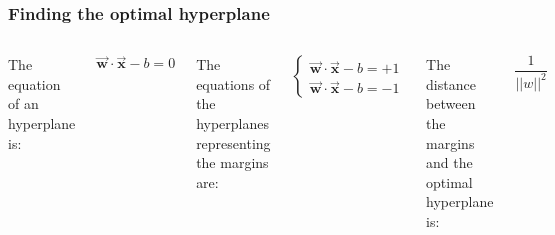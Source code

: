 \documentclass{beamer}
\begin{document}
\begin{frame}
  \frametitle{Finding the optimal hyperplane}
  \begin{columns}
      \parbox{\linewidth}{The equation of an hyperplane is:

      \begin{equation}
        \vec{\boldsymbol{w}} \cdot \vec{\boldsymbol{x}} - b = 0
      \end{equation}

      The equations of the hyperplanes representing the margins are:

      \begin{equation}
        \begin{cases}
          \vec{\boldsymbol{w}} \cdot \vec{\boldsymbol{x}} - b = +1\\
          \vec{\boldsymbol{w}} \cdot \vec{\boldsymbol{x}} - b = -1
        \end{cases}
      \end{equation}
      }

      The distance between the margins and the optimal hyperplane is:

      \begin{equation}
        \frac{1}{{\lvert \lvert w \rvert \rvert}^2}
      \end{equation}

      \centering
      \includegraphics[height=4.2cm]{img/svm_hyperplanes.png}
  \end{columns}
\end{frame}
\end{document}
